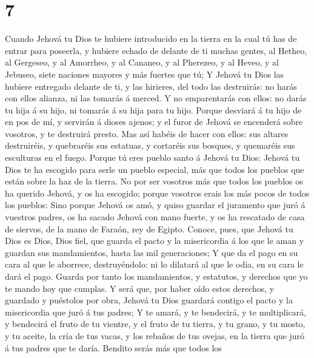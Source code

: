 \hypertarget{section-6}{%
\section{7}\label{section-6}}

 Cuando Jehová tu Dios te hubiere introducido en la tierra
en la cual tú has de entrar para poseerla, y hubiere echado de delante
de ti muchas gentes, al Hetheo, al Gergeseo, y al Amorrheo, y al
Cananeo, y al Pherezeo, y al Heveo, y al Jebuseo, siete naciones mayores
y más fuertes que tú;  Y Jehová tu Dios las hubiere
entregado delante de ti, y las hirieres, del todo las destruirás: no
harás con ellos alianza, ni las tomarás á merced.  Y no
emparentarás con ellos: no darás tu hija á su hijo, ni tomarás á su hija
para tu hijo.  Porque desviará á tu hijo de en pos de mí,
y servirán á dioses ajenos; y el furor de Jehová se encenderá sobre
vosotros, y te destruirá presto.  Mas así habéis de hacer
con ellos: sus altares destruiréis, y quebraréis sus estatuas, y
cortaréis sus bosques, y quemaréis sus esculturas en el fuego.
 Porque tú eres pueblo santo á Jehová tu Dios: Jehová tu
Dios te ha escogido para serle un pueblo especial, más que todos los
pueblos que están sobre la haz de la tierra.  No por ser
vosotros más que todos los pueblos os ha querido Jehová, y os ha
escogido; porque vosotros erais los más pocos de todos los pueblos:
 Sino porque Jehová os amó, y quiso guardar el juramento
que juró á vuestros padres, os ha sacado Jehová con mano fuerte, y os ha
rescatado de casa de siervos, de la mano de Faraón, rey de Egipto.
 Conoce, pues, que Jehová tu Dios es Dios, Dios fiel, que
guarda el pacto y la misericordia á los que le aman y guardan sus
mandamientos, hasta las mil generaciones;  Y que da el
pago en su cara al que le aborrece, destruyéndolo: ni lo dilatará al que
le odia, en su cara le dará el pago.  Guarda por tanto
los mandamientos, y estatutos, y derechos que yo te mando hoy que
cumplas.  Y será que, por haber oído estos derechos, y
guardado y puéstolos por obra, Jehová tu Dios guardará contigo el pacto
y la misericordia que juró á tus padres;  Y te amará, y
te bendecirá, y te multiplicará, y bendecirá el fruto de tu vientre, y
el fruto de tu tierra, y tu grano, y tu mosto, y tu aceite, la cría de
tus vacas, y los rebaños de tus ovejas, en la tierra que juró á tus
padres que te daría.  Bendito serás más que todos los
